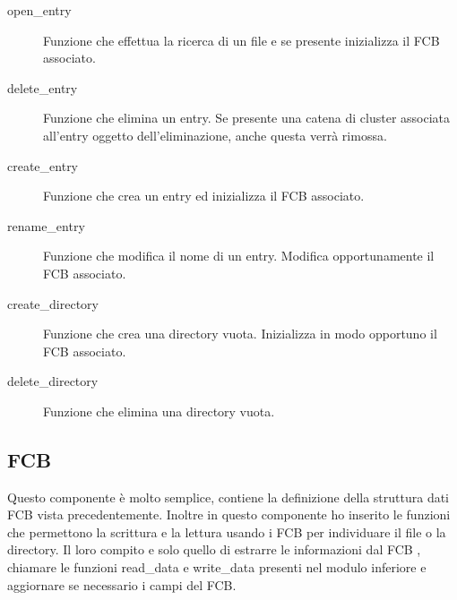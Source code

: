     \begin{description}
     \item[open\_entry]
     Funzione che effettua la ricerca di un file e se presente inizializza il FCB associato. 
     \end{description}

    \begin{description}
     \item[delete\_entry]
      Funzione che elimina un entry. Se presente una catena di cluster associata all'entry oggetto dell'eliminazione, anche questa verrà rimossa. 
     \end{description}
   
    \begin{description}
      \item[create\_entry]
      Funzione che crea un entry ed inizializza il FCB associato. 
    \end{description}

    \begin{description}
     \item[rename\_entry]
      Funzione che modifica il nome di un entry. Modifica opportunamente il FCB associato.   
   \end{description}

    \begin{description}
     \item[create\_directory]
      Funzione che crea una directory vuota. Inizializza in modo opportuno il FCB associato. 
     \end{description}

    \begin{description}
     \item[delete\_directory]
      Funzione che elimina una directory vuota. 
     \end{description}
  

  \subsection{FCB}
    Questo componente è molto semplice, contiene la definizione della struttura dati FCB vista precedentemente. Inoltre in questo componente ho inserito le funzioni che permettono la scrittura e la lettura
    usando i FCB per individuare  il file o la directory.  Il loro compito e solo quello di estrarre le informazioni dal FCB , chiamare le funzioni read\_data e write\_data presenti nel modulo inferiore e 
    aggiornare se necessario i campi del FCB. 
  

